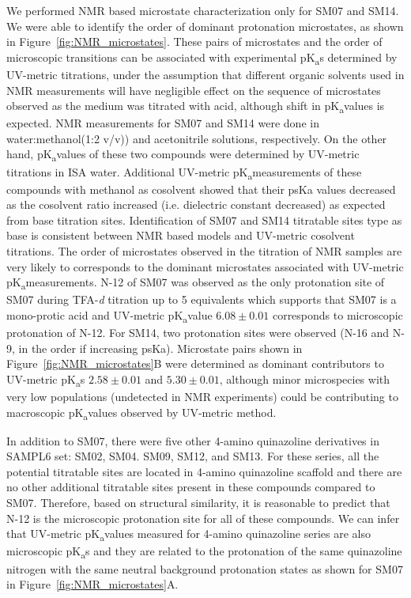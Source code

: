 \documentclass[9pt,lineno]{elife}
\newcommand{\pKa}{pK\textsubscript{a}}
\begin{document}
We performed NMR based microstate characterization only for SM07 and SM14. We were able to identify the order of dominant protonation microstates, as shown in Figure~\ref{fig:NMR_microstates}. 
These pairs of microstates and the order of microscopic transitions can be associated with experimental \pKa s determined by UV-metric titrations, under the assumption that different organic solvents used in NMR measurements will have negligible effect on the sequence of microstates observed as the medium was titrated with acid, although shift in \pKa values is expected. NMR measurements for SM07 and SM14 were done in water:methanol(1:2 v/v)) and acetonitrile solutions, respectively. 
On the other hand, \pKa values of these two compounds were determined by UV-metric titrations in ISA water. Additional UV-metric \pKa measurements of these compounds with methanol as cosolvent showed that their psKa values decreased as the cosolvent ratio increased (i.e. dielectric constant decreased) as expected from base titration sites. 
Identification of SM07 and SM14 titratable sites type as base is consistent between NMR based models and UV-metric cosolvent titrations. 
The order of microstates observed in the titration of NMR samples are very likely to corresponds to the dominant microstates associated with UV-metric \pKa measurements. N-12 of SM07 was observed as the only protonation site of SM07 during TFA-\textit{d} titration up to 5 equivalents which supports that SM07 is a mono-protic acid and UV-metric \pKa value $6.08 \pm 0.01$ corresponds to microscopic protonation of N-12. For SM14, two protonation sites were observed (N-16 and N-9, in the order if increasing psKa). Microstate pairs shown in Figure~\ref{fig:NMR_microstates}B were determined as dominant contributors to UV-metric \pKa s $2.58 \pm 0.01 $ and $5.30 \pm 0.01$, although minor microspecies with very low populations (undetected in NMR experiments) could be contributing to macroscopic \pKa values observed by UV-metric method. 

In addition to SM07, there were five other 4-amino quinazoline derivatives in SAMPL6 set: SM02, SM04. SM09, SM12, and SM13. For these series, all the potential titratable sites are located in 4-amino quinazoline scaffold and there are no other additional titratable sites present in these compounds compared to SM07. Therefore, based on structural similarity, it is reasonable to predict that N-12 is the microscopic protonation site for all of these compounds. We can infer that UV-metric \pKa values measured for 4-amino quinazoline series are also microscopic \pKa s and they are related to the protonation of the same quinazoline nitrogen with the same neutral background protonation states as shown for SM07 in Figure~\ref{fig:NMR_microstates}A.
\end{document}
